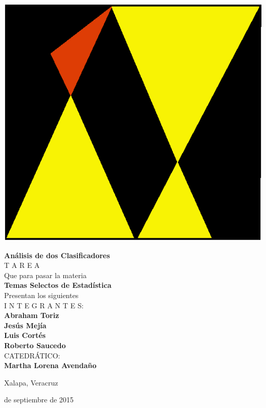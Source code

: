 \documentclass[11pt,letterpaper, reqno]{article}
\begin{document}
\begin{minipage}{.15\textwidth}
	\begin{flushright}
		\includegraphics[scale=.22]{matematicas.eps}
	\end{flushright}
\end{minipage}

\vspace{.7cm}
\begin{center}
{\huge \bf
	Análisis de dos Clasificadores
}
\\[1.5cm]
{ \Huge
	T A R E A
}
\\[1.5cm]

{ \large
	Que para pasar la materia
}
\\[.5cm]
{ \LARGE \bf
	Temas Selectos de Estadística
}
\\[1cm]
Presentan los siguientes\\[1cm]
{ \Large
I N T E G R A N T E S:
}\\
{ \LARGE \bf
	Abraham Toriz\\
	Jesús Mejía\\
	Luis Cortés\\
	Roberto Saucedo
}\\[1cm]
{ \Large
CATEDRÁTICO:
}\\
{ \LARGE \bf
	Martha Lorena Avendaño
}
\end{center}
\vspace{1.5cm}
\begin{minipage}{.5\textwidth}
\centering
Xalapa, Veracruz
\end{minipage}
\begin{minipage}{.5\textwidth}
 de septiembre de 2015
\end{minipage}
\end{document}
